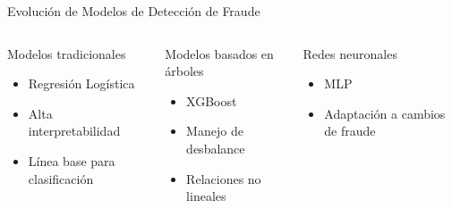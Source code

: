 \documentclass[aspectratio=169, 8pt]{beamer}
\begin{document}
\begin{frame}{Evolución de Modelos de Detección de Fraude}

\begin{columns}


\begin{block}{Modelos tradicionales}

\begin{itemize}

\item Regresión Logística

\item Alta interpretabilidad

\item Línea base para clasificación

\end{itemize}

\end{block}

\vspace{0.15cm}

\begin{block}{Modelos basados en árboles}

\begin{itemize}

\item XGBoost

\item Manejo de desbalance

\item Relaciones no lineales

\end{itemize}

\end{block}



\begin{block}{Redes neuronales}

\begin{itemize}

\item MLP

\item Adaptación a cambios de fraude

\end{itemize}

\end{block}


\end{columns}
\end{frame}
\end{document}
